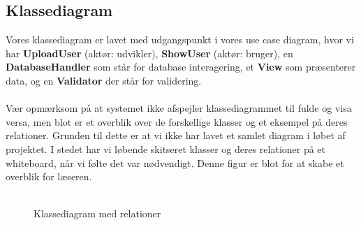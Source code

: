 \subsection{Klassediagram}
Vores klassediagram er lavet med udgangspunkt i vores use case diagram, hvor vi har \textbf{UploadUser} (aktør: udvikler), \textbf{ShowUser} (aktør: bruger), en \textbf{DatabaseHandler} som står for database interagering, et \textbf{View} som præsenterer data, og en \textbf{Validator} der står for validering.
\\\\
Vær opmærksom på at systemet ikke afspejler klassediagrammet til fulde og visa versa, men blot er et overblik over de forskellige klasser og et eksempel på deres relationer.
Grunden til dette er at vi ikke har lavet et samlet diagram i løbet af projektet.
I stedet har vi løbende skitseret klasser og deres relationer på et whiteboard, når vi følte det var nødvendigt.
Denne figur er blot for at skabe et overblik for læseren.
\\\\
\begin{figure}[H]
\caption{Klassediagram med relationer}
\label{fig:klassediagram}
\end{figure}
